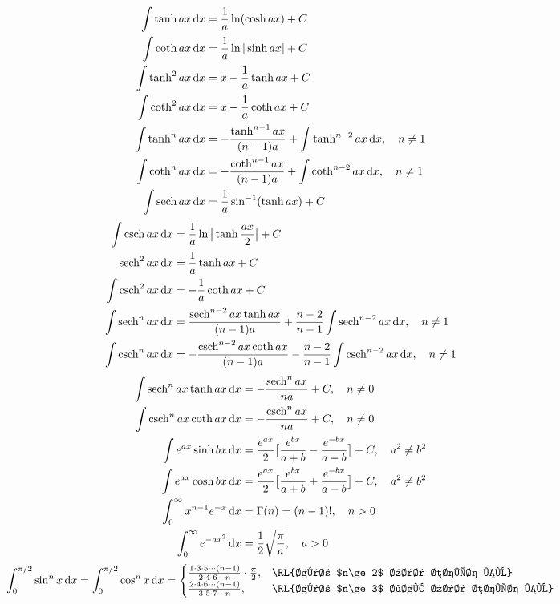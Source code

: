 \begin{align} 
 \int \tanh ax \dif x&= \frac{1}{a} \ln (\cosh ax) + C \\
 \int \coth ax \dif x &= \frac{1}{a} \ln | \sinh ax | + C \\
 \int \tanh^2 ax \dif x &= x - \frac{1}{a} \tanh ax + C \\
 \int \coth^2 ax \dif x &= x - \frac{1}{a} \coth ax + C \\
 \int \tanh^n ax \dif x &= - \frac{\tanh^{n-1} ax}{(n-1)a} + \int \tanh^{n-2} ax \dif x , \quad n \neq 1 \\
 \int \coth^n ax \dif x &= - \frac{\coth^{n-1} ax}{(n-1)a} + \int \coth^{n-2} ax \dif x , \quad n \neq 1 \\
 \int \sech ax \dif x &= \frac{1}{a} \sin^{-1} (\tanh ax) + C 
\end{align}
\begin{align} 
 \int \csch ax \dif x &= \frac{1}{a} \ln \big| \tanh \frac{ax}{2} \big| + C \\
 \sech^2 ax \dif x &= \frac{1}{a} \tanh ax + C \\
 \int \csch^2 ax \dif x &= - \frac{1}{a} \coth ax + C \\
 \int \sech^n ax \dif x &= \frac{\sech^{n-2} ax \tanh ax }{(n-1)a} + \frac{n-2}{n-1} \int \sech^{n-2} ax \dif x, \quad n \neq 1 \\
 \int \csch^n ax \dif x &= - \frac{\csch^{n-2} ax \coth ax }{(n-1)a} - \frac{n-2}{n-1} \int \csch^{n-2} ax \dif x, \quad n \neq 1
 \end{align}
\begin{align}
  \int \sech^n ax \tanh ax \dif x &= - \frac{\sech^n ax}{na} + C, \quad n\neq 0 \\
 \int \csch^n ax \coth ax \dif x &= - \frac{\csch^n ax}{na} + C, \quad n\neq 0 \\
 \int e^{ax} \sinh bx \dif x &= \frac{e^{ax}}{2} \big[ \frac{e^{bx}}{a+b} - \frac{e^{-bx}}{a-b} \big] + C, \quad a^2 \neq b^2 \\
 \int e^{ax} \cosh bx \dif x &= \frac{e^{ax}}{2} \big[ \frac{e^{bx}}{a+b} + \frac{e^{-bx}}{a-b} \big] + C, \quad a^2 \neq b^2 \\
 \int^{\infty}_{0} x^{n-1} e^{-x}\dif x &= \Gamma (n) = (n-1)!, \quad n>0 \\
 \int^{\infty}_{0} e^{-ax^{2}} \dif x &= \frac{1}{2} \sqrt{\frac{\pi}{a}}, \quad a> 0 
\end{align}
\begin{align}
\int_0^{\pi/2}\sin^nx\dif x=\int_0^{\pi/2}\cos^nx\dif x=
\begin{cases}
\frac{1\cdot 3\cdot 5\cdots(n-1)}{2\cdot 4\cdot 6\cdots n}\cdot\frac{\pi}{2},&\text{\RL{اگر $n\ge 2$ عدد صحیح ہو}}\\
\frac{2\cdot 4\cdot 6\cdots (n-1)}{3\cdot 5\cdot 7\cdots n},&\text{\RL{اگر $n\ge 3$ طاق عدد صحیح ہو}}
\end{cases}
\end{align}





